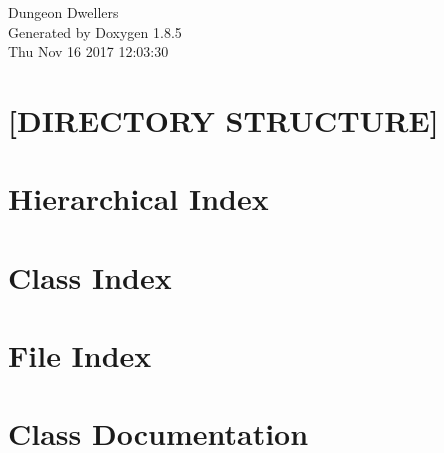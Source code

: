 \documentclass[twoside]{book}
\newcommand{\clearemptydoublepage}{%
  \newpage{\pagestyle{empty}\cleardoublepage}%
}
\begin{document}
\hypersetup{pageanchor=false}
\begin{titlepage}
\vspace*{7cm}
\begin{center}%
{\Large Dungeon Dwellers }\\
\vspace*{1cm}
{\large Generated by Doxygen 1.8.5}\\
\vspace*{0.5cm}
{\small Thu Nov 16 2017 12:03:30}\\
\end{center}
\end{titlepage}
\clearemptydoublepage
\tableofcontents
\clearemptydoublepage
{}
\hypersetup{pageanchor=true}

\chapter{\mbox{[}D\-I\-R\-E\-C\-T\-O\-R\-Y S\-T\-R\-U\-C\-T\-U\-R\-E\mbox{]}}
\label{md__home_rigt2720_Kodika_README}
\hypertarget{md__home_rigt2720_Kodika_README}{}

\chapter{Hierarchical Index}

\chapter{Class Index}

\chapter{File Index}

\chapter{Class Documentation}




















































\end{document}
